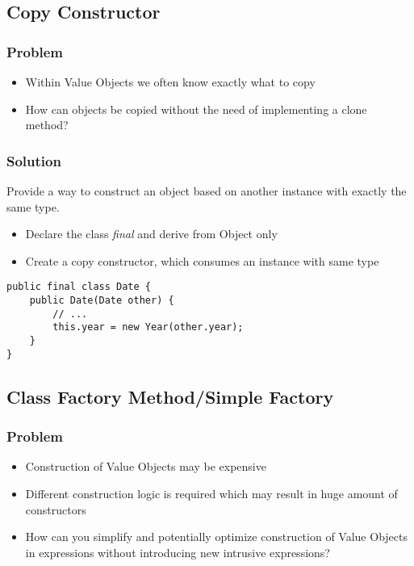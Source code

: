 \subsection{Copy Constructor}
\subsubsection{Problem}
\begin{itemize}[topsep=0pt]
    \itemsep -0.4em
    \item Within Value Objects we often know exactly what to copy
    \item How can objects be copied without the need of implementing a clone method?
\end{itemize}
\subsubsection{Solution}
Provide a way to construct an object based on another instance with exactly the same type.
\begin{itemize}[topsep=0pt]
    \itemsep -0.4em
    \item Declare the class \textit{final} and derive from Object only
    \item Create a copy constructor, which consumes an instance with same type
\end{itemize} 
\begin{lstlisting}[style=htmlcssjs]
public final class Date {
    public Date(Date other) {
        // ... 
        this.year = new Year(other.year);
    }
}
\end{lstlisting}

\subsection{Class Factory Method/Simple Factory}
\subsubsection{Problem}
\begin{itemize}[topsep=0pt]
    \itemsep -0.4em
    \item Construction of Value Objects may be expensive
    \item Different construction logic is required which may result in huge amount of constructors
    \item How can you simplify and potentially optimize construction of Value Objects in expressions without introducing new intrusive expressions?
\end{itemize}
